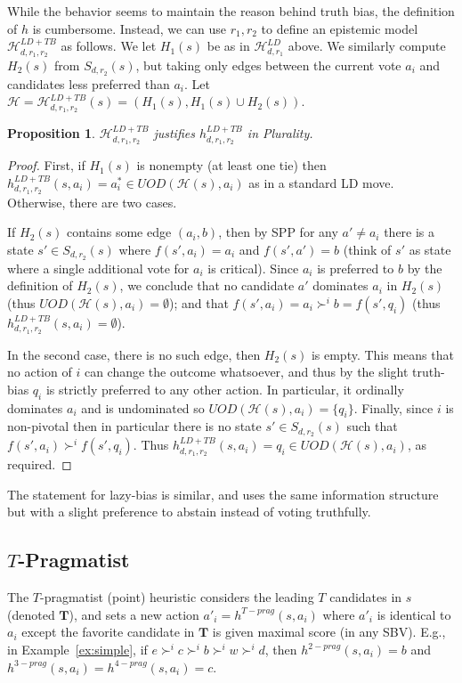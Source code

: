 \documentclass[letterpaper]{article} %
\def\calH{\mathcal{H}}
\newtheorem{proposition}[theorem]{Proposition}
\begin{document}
While the behavior seems to maintain the reason behind truth bias, the definition of $h$ is cumbersome. Instead, we can use $r_1,r_2$ to define an epistemic model $\calH^{LD+TB}_{d,r_1,r_2}$ as follows. We let $H_1(s)$ be as in $\calH^{LD}_{d,r_1}$ above. We similarly compute $H_{2}(s)$ from $S_{d,r_2}(s)$, but taking only edges between the current vote $a_i$ and candidates less preferred than $a_i$. Let $\calH = \calH^{LD+TB}_{d,r_1,r_2}(s) = (H_1(s),H_1(s) \cup H_2(s))$. 
\begin{proposition} $\calH^{LD+TB}_{d,r_1,r_2}$ justifies $h^{LD+TB}_{d,r_1,r_2}$ in Plurality.
\end{proposition}
\begin{proof}
First, if $H_1(s)$ is nonempty (at least one tie) then $h^{LD+TB}_{d,r_1,r_2}(s,a_i)= a^*_i \in UOD(\calH(s),a_i)$ as in a standard LD move. Otherwise, there are two cases. 

If $H_2(s)$ contains some edge $(a_i,b)$, then by SPP for any $a'\neq a_i$ there is a state $s'\in S_{d,r_2}(s)$ where $f(s',a_i)=a_i$ and $f(s',a')=b$ (think of $s'$ as state where a single additional vote for $a_i$ is critical). Since $a_{i}$ is preferred to $b$ by the definition of $H_{2}(s)$, we conclude that no candidate $a'$ dominates $a_i$ in $H_2(s)$ (thus $UOD(\calH(s),a_i)=\emptyset$); and that $f(s',a_i) =a_i \succ^i b= f(s',q_i)$ (thus $h^{LD+TB}_{d,r_1,r_2}(s,a_i)=\emptyset$). 

In the second case, there is no such edge, then $H_2(s)$ is empty. This means that no action of $i$ can change the outcome whatsoever, and thus by the slight truth-bias $q_i$ is strictly preferred to any other action. In particular, it ordinally dominates $a_i$ and is undominated so $UOD(\calH(s),a_i) = \{q_i\}$.
Finally, since $i$ is non-pivotal then in particular there is no state $s'\in S_{d,r_2}(s)$ such that $f(s',a_i) \succ^i f(s',q_i)$. Thus $h^{LD+TB}_{d,r_1,r_2}(s,a_i)=q_i \in UOD(\calH(s),a_i)$, as required. 
\end{proof}

The statement for lazy-bias is similar, and uses the same information structure but with a slight preference to abstain instead of voting truthfully. 

\subsection{$T$-Pragmatist} The $T$-pragmatist (point) heuristic \cite{brams1978approval,RE12} considers the leading $T$ candidates in $s$ (denoted $\mathbf T$), and sets a new action $a'_i=h^{T-prag}(s,a_i)$ where $a'_i$ is identical to $a_i$ except the favorite candidate in $\mathbf T$ is given maximal score (in any SBV). E.g., in Example~\ref{ex:simple}, if $e\succ^i c\succ^i b \succ^i w \succ^i d$, then $h^{2\!-\!prag}(s,a_i)\!=\!b$ and $h^{3\!-\!prag}(s,a_i)\!=\!h^{4\!-\!prag}(s,a_i)\!=\!c$.
\end{document}
